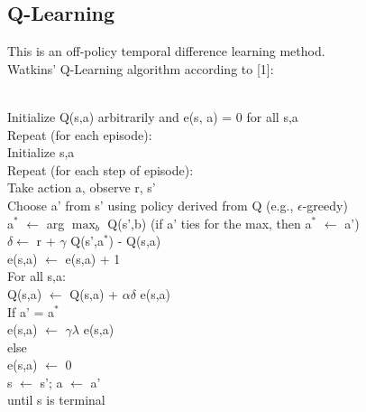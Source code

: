 \documentclass{article}
\newcommand{\tab}{\hspace{10mm}}
\newcommand{\dtab}{\hspace{20mm}}
\newcommand{\ttab}{\hspace{30mm}}
\newcommand{\qtab}{\hspace{40mm}}
\begin{document}
\subsection*{Q-Learning}
This is an off-policy temporal difference learning method.
\\
Watkins' Q-Learning algorithm according to [1]: \\\\
\begin{algorithm}[H]
Initialize Q(s,a) arbitrarily and e(s, a) = 0 for all s,a \\
Repeat (for each episode):\\
\tab Initialize s,a\\
\tab Repeat (for each step of episode):\\
\dtab Take action a, observe r, s'\\
\dtab Choose a' from s' using policy derived from Q (e.g., $\epsilon$-greedy)\\
\dtab a$^*$ $\leftarrow$ arg $\max_b$ Q(s',b) (if a' ties for the max, then a$^*$ $\leftarrow$ a') \\
\dtab $\delta \leftarrow$ r + $\gamma$ Q(s',a$^*$) - Q(s,a)\\
\dtab e(s,a) $\leftarrow$ e(s,a) + 1\\
\dtab For all s,a:\\
\ttab Q(s,a) $\leftarrow$ Q(s,a) + $\alpha \delta$ e(s,a) \\
\ttab If a' = a$^*$ \\
\qtab e(s,a) $\leftarrow$ $\gamma \lambda$ e(s,a)\\
\ttab else \\
\qtab e(s,a) $\leftarrow$ 0\\
\dtab s $\leftarrow$ s'; a $\leftarrow$ a'\\
\tab until s is terminal\\
\end{algorithm}
\end{document}
